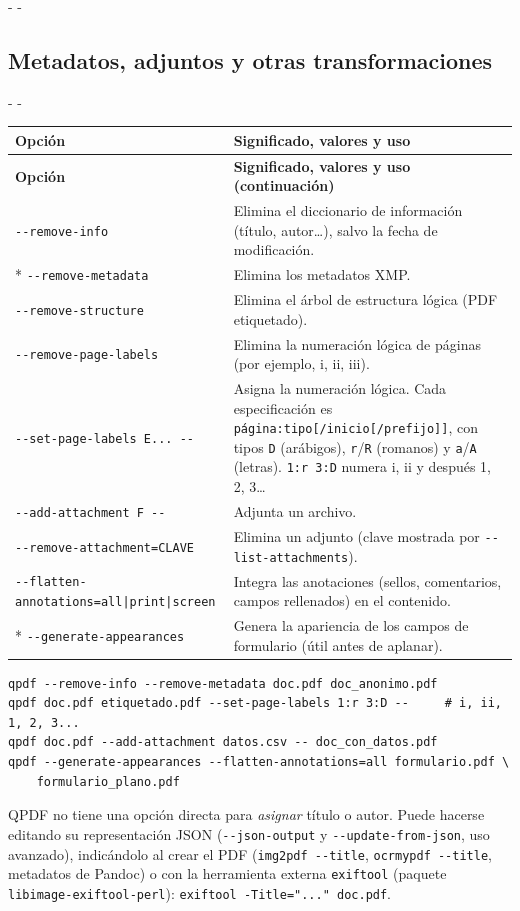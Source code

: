 \documentclass[11pt,a4paper]{article}
\makeatletter
\newcommand{\necesitaespacio}[1]{\par\penalty-100\begingroup
	\setlength{\dimen@}{#1}\dimen@ii\pagegoal\advance\dimen@ii-\pagetotal
	\ifdim\dimen@>\dimen@ii\ifdim\dimen@ii>\z@\vfil\fi\penalty-\@M\fi\endgroup}
\newenvironment{opciones}[1][Opción]{%
	\par\begingroup\small
	\begin{longtable}{L{4.25cm}L{11.2cm}}
		\toprule\rowcolor{tablacab}\cab{#1} & \cab{Significado, valores y uso} \\ \midrule
		\endfirsthead
		\toprule\rowcolor{tablacab}\cab{#1} & \cab{Significado, valores y uso (continuación)} \\ \midrule
		\endhead
		\bottomrule
		\endfoot}
	{\end{longtable}\endgroup}
\newcommand{\cmd}[1]{\texttt{\textcolor{colcmd}{#1}}}      %
\newcommand{\opt}[1]{\texttt{\textcolor{colopt}{#1}}}      %
\newcommand{\val}[1]{\texttt{#1}}                          %
\newcommand{\cab}[1]{\textbf{#1}}
\makeatother
\begin{document}
	\necesitaespacio{30\baselineskip}
	\subsection{Metadatos, adjuntos y otras transformaciones}
	
	\necesitaespacio{26\baselineskip}
	\begin{opciones}
		\opt{-{}-remove-info} & Elimina el diccionario de información (título, autor\ldots), salvo la fecha de modificación.\\*
		\opt{-{}-remove-\allowbreak{}metadata} & Elimina los metadatos XMP.\\
		\opt{-{}-remove-\allowbreak{}structure} & Elimina el árbol de estructura lógica (PDF etiquetado).\\
		\opt{-{}-remove-\allowbreak{}page-\allowbreak{}labels} & Elimina la numeración lógica de páginas (por ejemplo, i, ii, iii).\\
		\opt{-{}-set-\allowbreak{}page-\allowbreak{}labels E... -{}-} & Asigna la numeración lógica. Cada especificación es \val{página:tipo[/\allowbreak{}inicio[/\allowbreak{}prefijo]]}, con tipos \val{D} (arábigos), \val{r}/\val{R} (romanos) y \val{a}/\val{A} (letras). \val{1:r 3:D} numera i, ii y después 1, 2, 3\ldots\\
		\opt{-{}-add-\allowbreak{}attachment F -{}-} & Adjunta un archivo.\\
		\opt{-{}-remove-\allowbreak{}attachment=\allowbreak{}CLAVE} & Elimina un adjunto (clave mostrada por \opt{-{}-list-\allowbreak{}attachments}).\\
		\opt{-{}-flatten-\allowbreak{}annotations=\allowbreak{}all|\allowbreak{}print|\allowbreak{}screen} & Integra las anotaciones (sellos, comentarios, campos rellenados) en el contenido.\\*
		\opt{-{}-generate-\allowbreak{}appearances} & Genera la apariencia de los campos de formulario (útil antes de aplanar).\\
	\end{opciones}
	
	\begin{lstlisting}
qpdf --remove-info --remove-metadata doc.pdf doc_anonimo.pdf
qpdf doc.pdf etiquetado.pdf --set-page-labels 1:r 3:D --     # i, ii, 1, 2, 3...
qpdf doc.pdf --add-attachment datos.csv -- doc_con_datos.pdf
qpdf --generate-appearances --flatten-annotations=all formulario.pdf \
    formulario_plano.pdf
\end{lstlisting}
	
	\begin{nota}
		QPDF no tiene una opción directa para \emph{asignar} título o autor. Puede hacerse editando su representación JSON (\opt{-{}-json-output} y \opt{-{}-update-\allowbreak{}from-\allowbreak{}json}, uso avanzado), indicándolo al crear el PDF (\cmd{img2pdf -{}-title}, \cmd{ocrmypdf -{}-title}, metadatos de Pandoc) o con la herramienta externa \cmd{exiftool} (paquete \texttt{libimage-\allowbreak{}exiftool-\allowbreak{}perl}): \cmd{exiftool -Title=\allowbreak{}"..." doc.pdf}.
	\end{nota}
	
\end{document}
